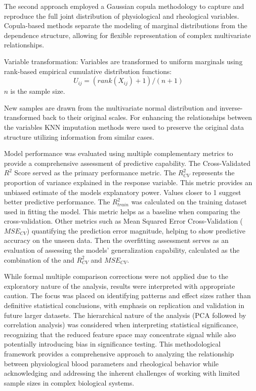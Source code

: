 \documentclass[12pt,letterpaper]{article}
\begin{document}
The second approach employed a Gaussian copula methodology to capture and reproduce the full joint distribution of physiological and rheological variables.
Copula-based methods separate the modeling of marginal distributions from the dependence structure, allowing for flexible representation of complex multivariate relationships.

Variable transformation: Variables are transformed to uniform marginals using rank-based empirical cumulative distribution functions:
$$
    U_{ij} = (rank(X_{ij})+1)/(n+1)
$$
$n$ is the sample size.

New samples are drawn from the multivariate normal distribution and inverse-transformed back to their original scales.
For enhancing the relationships between the variables KNN imputation methods were used to preserve the original data structure utilizing information from similar cases.

Model performance was evaluated using multiple complementary metrics to provide a comprehensive assessment of predictive capability.
The Cross-Validated $R^2$ Score served as the primary performance metric. The $R^2_{CV}$ represents the proportion of variance explained in the response variable.
This metric provides an unbiased estimate of the models explanatory power. Values closer to 1 suggest better predictive performance. The $R^2_{train}$ was calculated on the
training dataset used in fitting the model. This metric helps as a baseline when comparing the cross-validation. Other metrics such as Mean Squared Error Cross-Validation ($MSE_{CV}$)
quantifying the prediction error magnitude, helping to show predictive accuracy on the unseen data. Then the overfitting assessment serves as an evaluation of assessing the models'
generalization capability, calculated as the combination of the and $R^2_{CV}$ and $MSE_{CV}$.

While formal multiple comparison corrections were not applied due to the exploratory nature of the analysis,
results were interpreted with appropriate caution. The focus was placed on identifying patterns and effect sizes rather than definitive statistical conclusions,
with emphasis on replication and validation in future larger datasets. The hierarchical nature of the analysis (PCA followed by correlation analysis) was considered when
interpreting statistical significance, recognizing that the reduced feature space may concentrate signal while also potentially introducing bias in significance testing.
This methodological framework provides a comprehensive approach to analyzing the relationship between physiological blood parameters and rheological behavior while acknowledging
and addressing the inherent challenges of working with limited sample sizes in complex biological systems.
\end{document}
